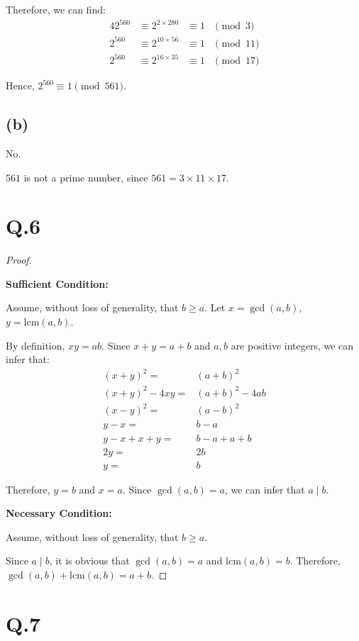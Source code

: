 \documentclass[a4paper,12pt]{article}
\begin{document}
Therefore, we can find:
\begin{alignat*}{4}
	2^{560} &\equiv 2^{2 \times 280} &\equiv 1 &\pmod{3} \\
	2^{560} &\equiv 2^{10 \times 56} &\equiv 1 &\pmod{11} \\
	2^{560} &\equiv 2^{16 \times 35} &\equiv 1 &\pmod{17}
\end{alignat*}

Hence, $2^{560} \equiv 1 \pmod{561}$.

\subsection*{(b)}

No.

$561$ is not a prime number, since $561 = 3 \times 11 \times 17$.

\section*{Q.6}

\begin{proof}
$ $

\textbf{Sufficient Condition:}

Assume, without loss of generality, that $b \geq a$.
Let $x = \gcd(a,b)$, $y = \text{lcm}(a,b)$. 

By definition, $xy = ab$. 
Since $x + y = a + b$ and $a, b$ are positive integers, we can infer that:
\begin{align*}
	(x + y)^2 =& (a + b)^2 \\
	(x + y)^2 - 4xy =& (a + b)^2 - 4ab \\
	(x - y)^2 =& (a - b)^2 \\
	y - x =& b - a \\
	y - x + x + y =& b - a + a + b \\
	2y =& 2b \\
	y =& b
\end{align*}

Therefore, $y = b$ and $x = a$.
Since $\gcd(a,b) = a$, we can infer that $a \mid b$.

\textbf{Necessary Condition:}

Assume, without loss of generality, that $b \geq a$.

Since $a \mid b$, it is obvious that $\gcd(a,b) = a$ and $\text{lcm}(a,b) = b$.
Therefore, $\gcd(a,b) + \text{lcm}(a,b) = a + b$.
\end{proof}

\section*{Q.7}
\end{document}
